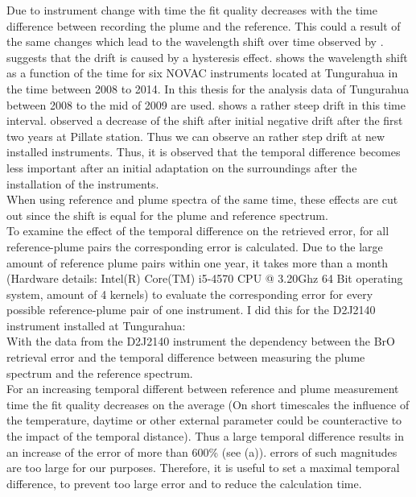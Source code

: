 Due to instrument change with time the fit quality decreases with the time difference between recording the plume and the reference. This could a result of the same changes which lead to the wavelength shift over time observed by \citet{WarnachSimon}.  \citet{WarnachSimon} suggests that the drift is caused by a hysteresis effect.  shows the wavelength shift as a function of the time for six NOVAC instruments located at Tungurahua in the time between 2008 to 2014. In this thesis for the analysis data of Tungurahua between 2008 to the mid of 2009 are used.  shows a rather steep drift in this time interval.
\citet{WarnachSimon} observed a decrease of the shift after initial negative drift after the first two years at Pillate station. Thus we can observe an rather step drift at new installed instruments. Thus, it is observed that the temporal difference becomes less important after an initial adaptation on the surroundings after the installation of the instruments.\\
When using reference and plume spectra of the same time, these effects are cut out since the shift is equal for the plume and reference spectrum.\\
To examine the effect of the temporal difference on the retrieved  error, for all reference-plume pairs the corresponding  error is calculated. Due to the large amount of reference plume pairs within one year, it takes more than a month (Hardware details: Intel(R) Core(TM) i5-4570 CPU @ 3.20Ghz 64 Bit operating system, amount of 4 kernels) to evaluate the corresponding  error for every possible reference-plume pair of one instrument. I did this for the  D2J2140 instrument installed at Tungurahua:\\
With the data from the D2J2140 instrument the dependency between the BrO retrieval error and the temporal difference between measuring the plume spectrum and the reference spectrum.\\
For an increasing temporal different between reference and plume measurement time the fit quality decreases on the average (On short timescales the influence of the temperature, daytime or other external parameter could be counteractive to the impact of the temporal distance). Thus a large temporal difference results in an increase of the   error of more than 600\% (see  (a)).
 errors of such magnitudes are too large for our purposes. Therefore, it is useful to set a maximal temporal difference, to prevent too large  error and to reduce the calculation time.
